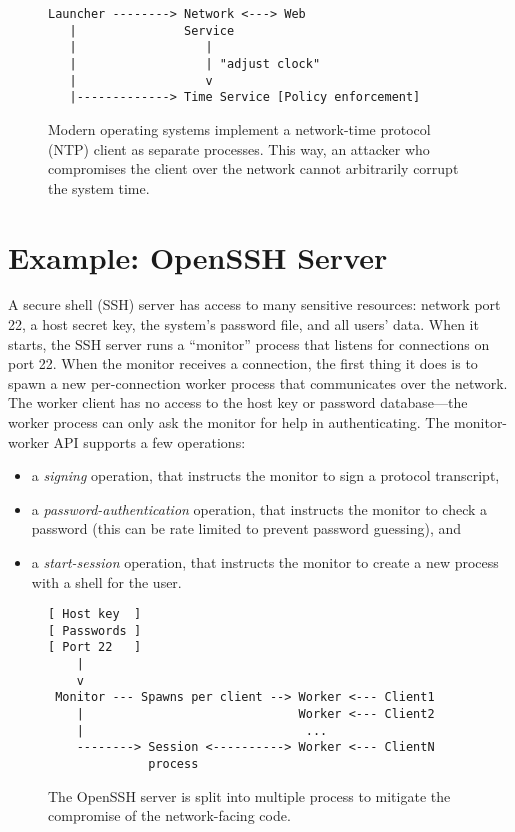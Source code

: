 \begin{figure}
\begin{verbatim}
Launcher --------> Network <---> Web
   |               Service                 
   |                  |
   |                  | "adjust clock"
   |                  v
   |-------------> Time Service [Policy enforcement]
\end{verbatim}
\caption{Modern operating systems implement 
a network-time protocol (NTP) client as separate processes.
  This way, an attacker who compromises the client over
  the network cannot arbitrarily corrupt the system time.}\label{fig:ntp}
\end{figure}

\section{Example: OpenSSH Server}
A secure shell (SSH) server has access to many sensitive resources:
network port 22, a host secret key, the system's password file, and
all users' data.
When it starts, the SSH server runs a ``monitor'' process that listens
for connections on port 22. When the monitor receives a connection,
the first thing it does is to spawn a new per-connection worker process
that communicates over the network.
The worker client has no access to the host key or password database---the
worker process can only ask the monitor for help in authenticating.
The monitor-worker API supports a few operations:
\begin{itemize}
\item a \emph{signing} operation, that instructs the monitor to sign a protocol
        transcript, 
      \item a \emph{password-authentication} operation, that instructs
the monitor to check a password (this can be rate limited to prevent
    password guessing), and 
      \item a \emph{start-session} operation, that instructs the monitor
        to create a new process with a shell for the user.
\end{itemize}

\begin{figure}
\begin{verbatim}
[ Host key  ]
[ Passwords ]
[ Port 22   ]
    |
    v
 Monitor --- Spawns per client --> Worker <--- Client1
    |                              Worker <--- Client2
    |                               ...
    --------> Session <----------> Worker <--- ClientN
              process

\end{verbatim}
\caption{The OpenSSH server is split into multiple process to mitigate the compromise of the network-facing code.}
\end{figure}

